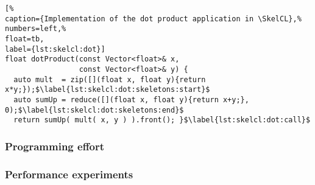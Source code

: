 \begin{lstlisting}[%                                                             
caption={Implementation of the dot product application in \SkelCL},%
numbers=left,%
float=tb,
label={lst:skelcl:dot}]
float dotProduct(const Vector<float>& x,
                 const Vector<float>& y) {
  auto mult  = zip([](float x, float y){return x*y;});$\label{lst:skelcl:dot:skeletons:start}$
  auto sumUp = reduce([](float x, float y){return x+y;}, 0);$\label{lst:skelcl:dot:skeletons:end}$
  return sumUp( mult( x, y ) ).front(); }$\label{lst:skelcl:dot:call}$
\end{lstlisting}

\subsubsection*{Programming effort}

\subsubsection*{Performance experiments}



